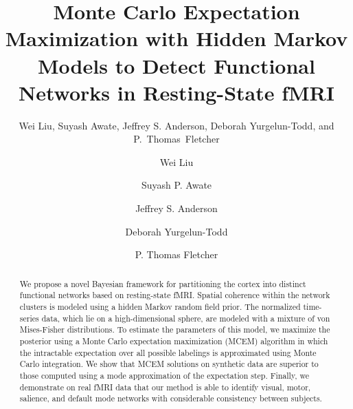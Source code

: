\documentclass[runningheads, a4paper]{llncs}
\begin{document}
\mainmatter  %

\title{Monte Carlo Expectation Maximization with Hidden Markov Models to Detect Functional Networks in Resting-State fMRI}
\author{Wei Liu, Suyash Awate, Jeffrey S. Anderson, Deborah Yurgelun-Todd, and
  P.~Thomas~Fletcher}


\author{Wei Liu \and Suyash P. Awate \and Jeffrey
  S. Anderson \and Deborah Yurgelun-Todd \and P. Thomas
  Fletcher}



 

\maketitle


\begin{abstract}
We propose a novel Bayesian framework for partitioning the cortex into
distinct functional networks based on resting-state fMRI. Spatial
coherence within the network clusters is modeled using a hidden Markov
random field prior. The normalized time-series data, which lie on a
high-dimensional sphere, are modeled with a mixture of von
Mises-Fisher distributions. To estimate the parameters of this model,
we maximize the posterior using a Monte Carlo expectation maximization
(MCEM) algorithm in which the intractable expectation over all
possible labelings is approximated using Monte Carlo integration. We
show that MCEM solutions on synthetic data are superior to those
computed using a mode approximation of the expectation step. Finally,
we demonstrate on real fMRI data that our method is able to identify
visual, motor, salience, and default mode networks with considerable
consistency between subjects.
\end{abstract}
\end{document}
